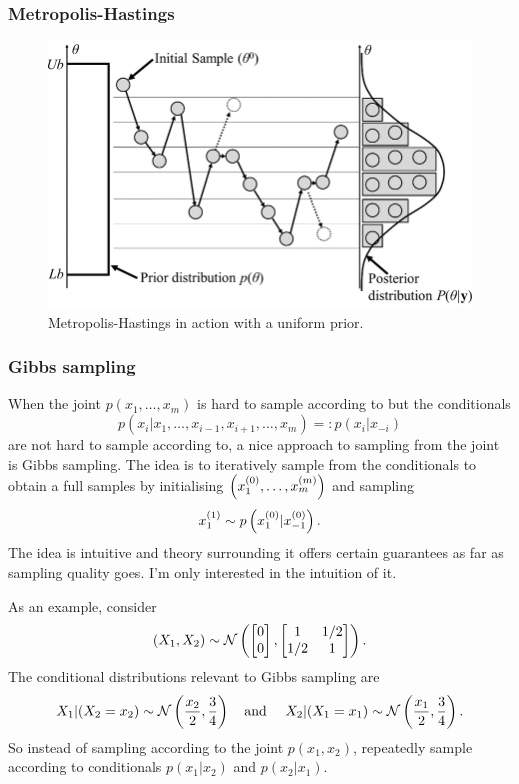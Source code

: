 \documentclass[11pt]{article}
\begin{document}
\begin{appendices}
\subsubsection{Metropolis-Hastings}

\begin{figure}[t]
    \centering
    \includegraphics[width=\columnwidth]{./figures/appendix/metropolis-hastings.png}
    \caption{Metropolis-Hastings in action with a uniform prior.}
    \label{fig:metropolis_hastings}
\end{figure}

\subsubsection{Gibbs sampling}
When the joint $p(x_1,\dots,x_m)$ is hard to sample according to but the conditionals
$$
p(x_i|x_1,\dots,x_{i-1},x_{i+1},\dots,x_m)
=:
p(x_i|x_{-i})
$$
are not hard to sample according to, a nice approach to sampling from the joint is Gibbs sampling. The idea is to iteratively sample from the conditionals to obtain a full samples by initialising $\left(x_1^{(0)},\dots,x_m^{(m)}\right)$ and sampling
$$
x_1^{(1)}\sim p\left(x_1^{(0)}|x_{-1}^{(0)}\right).
$$
The idea is intuitive and theory surrounding it offers certain guarantees as far as sampling quality goes. I'm only interested in the intuition of it.

As an example, consider
$$
(X_1,X_2)
\sim
\mathcal{N}\left(\begin{bmatrix} 0 \\ 0 \end{bmatrix}, \begin{bmatrix}1 & 1/2\\ 1/2 & 1\end{bmatrix}\right).
$$
The conditional distributions relevant to Gibbs sampling are
$$
X_1|(X_2=x_2)\sim\mathcal{N}\l(\frac{x_2}{2},\frac{3}{4}\r)
\hfill
\quad\text{and }\quad
X_2|(X_1=x_1)\sim\mathcal{N}\l(\frac{x_1}{2},\frac{3}{4}\r).
$$
So instead of sampling according to the joint $p(x_1,x_2)$, repeatedly sample according to conditionals $p(x_1|x_2)$ and $p(x_2|x_1)$.


\end{appendices}
\end{document}
